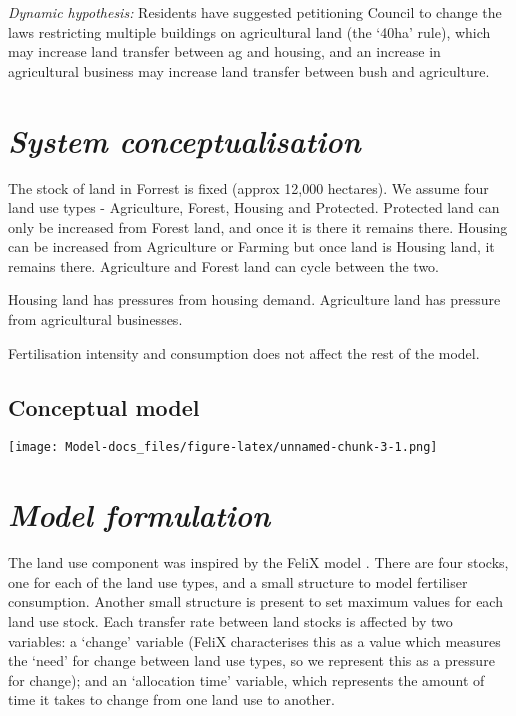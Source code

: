 \documentclass[
  11pt,
]{book}
\begin{document}
\emph{Dynamic hypothesis:}
Residents have suggested petitioning Council to change the laws restricting multiple buildings on agricultural land (the `40ha' rule), which may increase land transfer between ag and housing, and an increase in agricultural business may increase land transfer between bush and agriculture.

\hypertarget{system-conceptualisation-1}{%
\section{\texorpdfstring{\emph{System conceptualisation}}{System conceptualisation}}\label{system-conceptualisation-1}}

The stock of land in Forrest is fixed (approx 12,000 hectares). We assume four land use types - Agriculture, Forest, Housing and Protected. Protected land can only be increased from Forest land, and once it is there it remains there. Housing can be increased from Agriculture or Farming but once land is Housing land, it remains there. Agriculture and Forest land can cycle between the two.

Housing land has pressures from housing demand. Agriculture land has pressure from agricultural businesses.

Fertilisation intensity and consumption does not affect the rest of the model.

\hypertarget{conceptual-model-1}{%
\subsection{Conceptual model}\label{conceptual-model-1}}

\texttt{[image: Model-docs\_files/figure-latex/unnamed-chunk-3-1.png]}

\hypertarget{model-formulation-1}{%
\section{\texorpdfstring{\emph{Model formulation}}{Model formulation}}\label{model-formulation-1}}

The land use component was inspired by the FeliX model \citet{rydzak_felix3_2013}. There are four stocks, one for each of the land use types, and a small structure to model fertiliser consumption. Another small structure is present to set maximum values for each land use stock. Each transfer rate between land stocks is affected by two variables: a `change' variable (FeliX characterises this as a value which measures the `need' for change between land use types, so we represent this as a pressure for change); and an `allocation time' variable, which represents the amount of time it takes to change from one land use to another.
\end{document}
